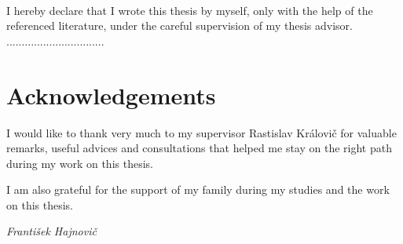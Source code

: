 \documentclass[a4paper]{article}
\numberwithin{algorithm}{section}
\numberwithin{figure}{section}
\numberwithin{table}{section}
\numberwithin{equation}{section}
\begin{document}
    \pagebreak
    
    
	\thispagestyle{empty}
	\mbox{}
    \pagebreak

	
    
    \pagebreak
    
	
    
    \pagebreak

    {~}\vfill

    I hereby declare that I wrote this thesis by myself, only with the help of the referenced literature, under the careful supervision of my thesis advisor.
    \vskip 1cm
    \hfill ................................

    \pagebreak

    \section*{Acknowledgements}
    I would like to thank very much to my supervisor Rastislav Královič for valuable remarks, useful advices and consultations that helped me stay on the right path during my work on this thesis.
    
    \hspace{40pt} I am also grateful for the support of my family during my studies and the work on this thesis.

	\vspace{1cm}    
    
    \hspace{\fill} \textit{František Hajnovič}

    \pagebreak
\end{document}
